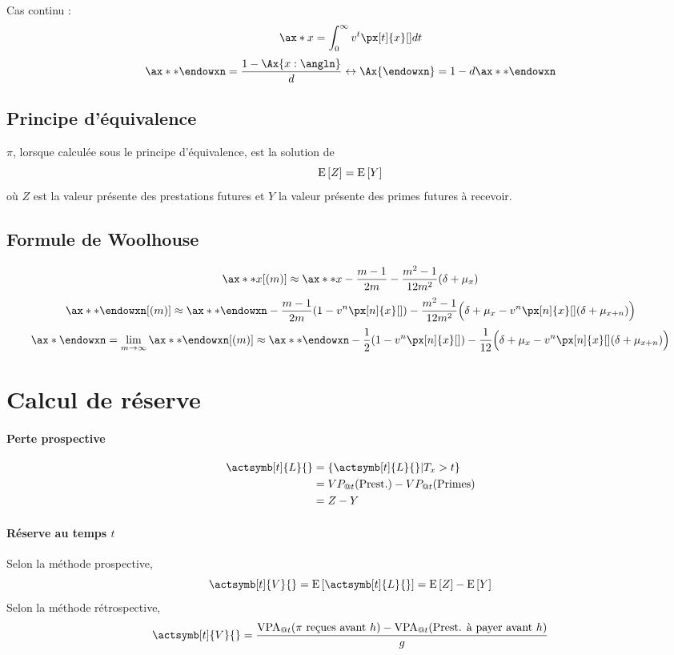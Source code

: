 \documentclass[10pt, french]{article}
\begin{document}
\begin{multicols*}{2}
Cas continu : 
\[\ax*{x} = \int_{0}^{\infty}  v^t \px[t]{x}[] dt \]
\[\ax**{\endowxn} = \frac{1 - \Ax{x:\angln}}{d} \leftrightarrow \Ax{\endowxn} =1 - d \ax**{\endowxn}\]




\subsection*{Principe d'équivalence}
$\pi$, lorsque calculée sous le principe d'équivalence, est la solution de
\[\mathrm{E} \left[ Z \right] = \mathrm{E} \left[ Y \right]\]
où $Z$ est la valeur présente des prestations futures et $Y$ la valeur présente des primes futures à recevoir.

\subsection*{Formule de Woolhouse}
\[\ax**{x}[(m)] \approx \ax**{x} - \frac{m-1}{2m} - \frac{m^2 -1}{12m^2} (\delta + \mu_x)  \]
\[\ax**{\endowxn}[(m)] \approx  \ax**{\endowxn} - \frac{m-1}{2m}(1  -v^n \px[n]{x}[]) - \frac{m^2 -1}{12m^2} \Big( \delta + \mu_x - v^n \px[n]{x}[](\delta + \mu_{x+n}) \Big)  \]
\[\ax*{\endowxn} = \lim_{m \to \infty}  \ax**{\endowxn}[(m)] \approx  \ax**{\endowxn} - \frac{1}{2} (1  -v^n \px[n]{x}[]) - \frac{1}{12} \Big( \delta + \mu_x - v^n \px[n]{x}[](\delta + \mu_{x+n}) \Big)  \]



\section{Calcul de réserve}
\paragraph{Perte prospective}
\begin{align*}
\actsymb[t]{L}{} & = \{ \actsymb[t]{L}{} | T_x > t \} \\
& = VP_{@t}(\text{Prest.}) - VP_{@t}(\text{Primes}) \\
& = Z - Y
\end{align*}

\paragraph{Réserve au temps $t$}
Selon la méthode prospective,
\[\actsymb[t]{V}{} = \esp{\actsymb[t]{L}{}} = \esp{Z} - \esp{Y}\]
Selon la méthode rétrospective,
\[\actsymb[t]{V}{} = \frac{\text{VPA}_{@t}(\text{$\pi$ reçues avant $h$}) - \text{VPA}_{@t}(\text{Prest. à payer avant $h$})}{g}\]


\end{multicols*}
\end{document}
